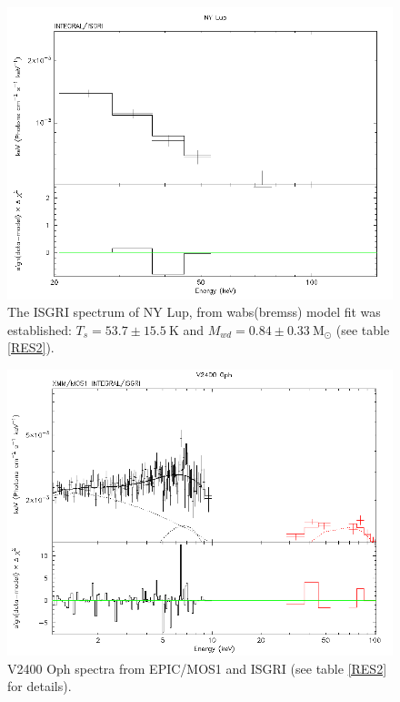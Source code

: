 \documentclass[oneside,a4paper,11pt]{report}
\begin{document}
\begin{figure}[!hbt]
\centering
\includegraphics[totalheight=8cm]{spec/2I}
\caption{The ISGRI spectrum of NY Lup, from wabs(bremss) model fit was established: $T_s=53.7 \pm 15.5 \: \mathrm{K}$ and $M_{wd} = 0.84 \pm 0.33 \: \mathrm{M_{\odot}}$ (see table \ref{RES2}).} 
\label{sp2I} 
\end{figure}


\begin{figure}[!hbt]
\centering
\includegraphics[totalheight=8cm]{spec/3}
\caption{V2400 Oph spectra from EPIC/MOS1 and ISGRI (see table \ref{RES2} for details).}
\label{sp3} 
\end{figure}
\end{document}
